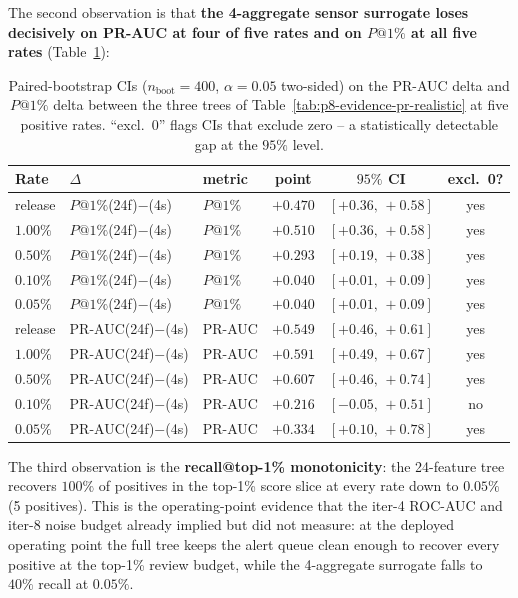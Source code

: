 \documentclass{article}
\providecommand{\tableref}[1]{Table~\ref{#1}}
\begin{document}
The second observation is that \textbf{the 4-aggregate sensor surrogate
loses decisively on PR-AUC at four of five rates and on $P@1\%$ at all
five rates} (\tableref{tab:p8-evidence-pr-realistic-boot}):

\begin{table}[t]
\centering
\small
\caption{Paired-bootstrap CIs ($n_{\text{boot}}{=}400$, $\alpha{=}0.05$
two-sided) on the PR-AUC delta and $P@1\%$ delta between the three
trees of \tableref{tab:p8-evidence-pr-realistic} at five positive
rates. ``excl.\ 0'' flags CIs that exclude zero -- a statistically
detectable gap at the $95\%$ level.}
\label{tab:p8-evidence-pr-realistic-boot}
\begin{tabular}{lllccc}
\toprule
Rate & $\Delta$ & metric & point & $95\%$ CI & excl.\ 0? \\
\midrule
release & $P@1\%$(24f)$-$(4s) & $P@1\%$ & $+0.470$ & $[+0.36,\,+0.58]$ & yes \\
$1.00\%$ & $P@1\%$(24f)$-$(4s) & $P@1\%$ & $+0.510$ & $[+0.36,\,+0.58]$ & yes \\
$0.50\%$ & $P@1\%$(24f)$-$(4s) & $P@1\%$ & $+0.293$ & $[+0.19,\,+0.38]$ & yes \\
$0.10\%$ & $P@1\%$(24f)$-$(4s) & $P@1\%$ & $+0.040$ & $[+0.01,\,+0.09]$ & yes \\
$0.05\%$ & $P@1\%$(24f)$-$(4s) & $P@1\%$ & $+0.040$ & $[+0.01,\,+0.09]$ & yes \\
\midrule
release & PR-AUC(24f)$-$(4s)    & PR-AUC & $+0.549$ & $[+0.46,\,+0.61]$ & yes \\
$1.00\%$ & PR-AUC(24f)$-$(4s) & PR-AUC & $+0.591$ & $[+0.49,\,+0.67]$ & yes \\
$0.50\%$ & PR-AUC(24f)$-$(4s) & PR-AUC & $+0.607$ & $[+0.46,\,+0.74]$ & yes \\
$0.10\%$ & PR-AUC(24f)$-$(4s) & PR-AUC & $+0.216$ & $[-0.05,\,+0.51]$ & no \\
$0.05\%$ & PR-AUC(24f)$-$(4s) & PR-AUC & $+0.334$ & $[+0.10,\,+0.78]$ & yes \\
\bottomrule
\end{tabular}
\end{table}

The third observation is the \textbf{recall@top-1\% monotonicity}: the
24-feature tree recovers $100\%$ of positives in the top-1\% score
slice at every rate down to $0.05\%$ (5 positives). This is the
operating-point evidence that the iter-4 ROC-AUC and iter-8 noise
budget already implied but did not measure: at the deployed operating
point the full tree keeps the alert queue clean enough to recover every
positive at the top-1\% review budget, while the 4-aggregate surrogate
falls to $40\%$ recall at $0.05\%$.
\end{document}
